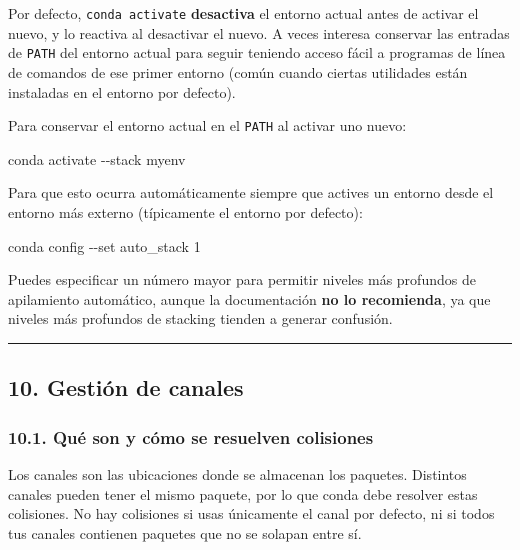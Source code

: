 \documentclass[
  doc,
  floatsintext,
  longtable,
  a4paper,
  nolmodern,
  notxfonts,
  notimes,
  12pt,
  colorlinks=true,linkcolor=blue,citecolor=blue,urlcolor=blue]{apa7}
\newenvironment{Shaded}{\begin{snugshade}}{\end{snugshade}}
\newcommand{\AttributeTok}[1]{\textcolor[rgb]{0.40,0.45,0.13}{#1}}
\newcommand{\ExtensionTok}[1]{\textcolor[rgb]{0.00,0.23,0.31}{#1}}
\newcommand{\NormalTok}[1]{\textcolor[rgb]{0.00,0.23,0.31}{#1}}
\begin{document}
Por defecto, \texttt{conda\ activate} \textbf{desactiva} el entorno
actual antes de activar el nuevo, y lo reactiva al desactivar el nuevo.
A veces interesa conservar las entradas de \texttt{PATH} del entorno
actual para seguir teniendo acceso fácil a programas de línea de
comandos de ese primer entorno (común cuando ciertas utilidades están
instaladas en el entorno por defecto).

Para conservar el entorno actual en el \texttt{PATH} al activar uno
nuevo:

\begin{Shaded}
\begin{Highlighting}[]
\ExtensionTok{conda}\NormalTok{ activate }\AttributeTok{{-}{-}stack}\NormalTok{ myenv}
\end{Highlighting}
\end{Shaded}

Para que esto ocurra automáticamente siempre que actives un entorno
desde el entorno más externo (típicamente el entorno por defecto):

\begin{Shaded}
\begin{Highlighting}[]
\ExtensionTok{conda}\NormalTok{ config }\AttributeTok{{-}{-}set}\NormalTok{ auto\_stack 1}
\end{Highlighting}
\end{Shaded}

Puedes especificar un número mayor para permitir niveles más profundos
de apilamiento automático, aunque la documentación \textbf{no lo
recomienda}, ya que niveles más profundos de stacking tienden a generar
confusión.

\begin{center}\rule{0.5\linewidth}{0.5pt}\end{center}

\subsection{10. Gestión de canales}\label{gestiuxf3n-de-canales}

\subsubsection{10.1. Qué son y cómo se resuelven
colisiones}\label{quuxe9-son-y-cuxf3mo-se-resuelven-colisiones}

Los canales son las ubicaciones donde se almacenan los paquetes.
Distintos canales pueden tener el mismo paquete, por lo que conda debe
resolver estas colisiones. No hay colisiones si usas únicamente el canal
por defecto, ni si todos tus canales contienen paquetes que no se
solapan entre sí.
\end{document}
